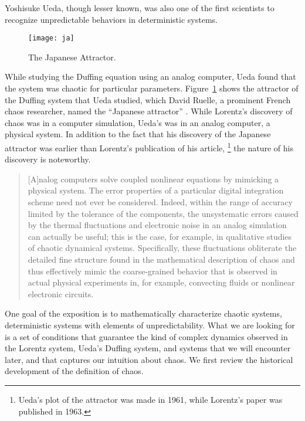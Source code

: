 \documentclass[10pt,twoside]{book}
\begin{document}
Yoshisuke Ueda, though lesser known, was also one of the first scientists to recognize unpredictable behaviors in deterministic systems.
\begin{figure}[ht]
  \centering
  \texttt{[image: ja]}
  \caption{The Japanese Attractor.}
  \label{fig:ja}
\end{figure}
While studying the Duffing equation using an analog computer, Ueda found that the system was chaotic for particular parameters.
Figure~\ref{fig:ja} shows the attractor of the Duffing system that Ueda studied, which David Ruelle, a prominent French chaos researcher, named the ``Japanese attractor'' \citep{ruelle}.
While Lorentz's discovery of chaos was in a computer simulation, Ueda's was in an analog computer, a physical system.
In addition to the fact that his discovery of the Japanese attractor was earlier than Lorentz's publication of his article,
\footnote{Ueda's plot of the attractor was made in 1961, while Lorentz's paper was published in 1963.}
the nature of his discovery is noteworthy.
\begin{quotation}
  [A]nalog computers solve coupled nonlinear equations by mimicking a physical system.
  The error properties of a particular digital integration scheme need not ever be considered.
  Indeed, within the range of accuracy limited by the tolerance of the components, the unsystematic errors caused by the thermal fluctuations and electronic noise in an analog simulation can actually be useful; this is the case, for example, in qualitative studies of chaotic dynamical systems.
  Specifically, these fluctuations obliterate the detailed fine structure found in the mathematical description of chaos and thus effectively mimic the coarse-grained behavior that is observed in actual physical experiments in, for example, convecting fluids or nonlinear electronic circuits.
  \citep[p.383]{campbell}
\end{quotation}


One goal of the exposition is to mathematically characterize chaotic systems, deterministic systems with elements of unpredictability.
What we are looking for is a set of conditions that guarantee the kind of complex dynamics observed in the Lorentz system, Ueda's Duffing system, and systems that we will encounter later, and that captures our intuition about chaos.
We first review the historical development of the definition of chaos.
\end{document}
